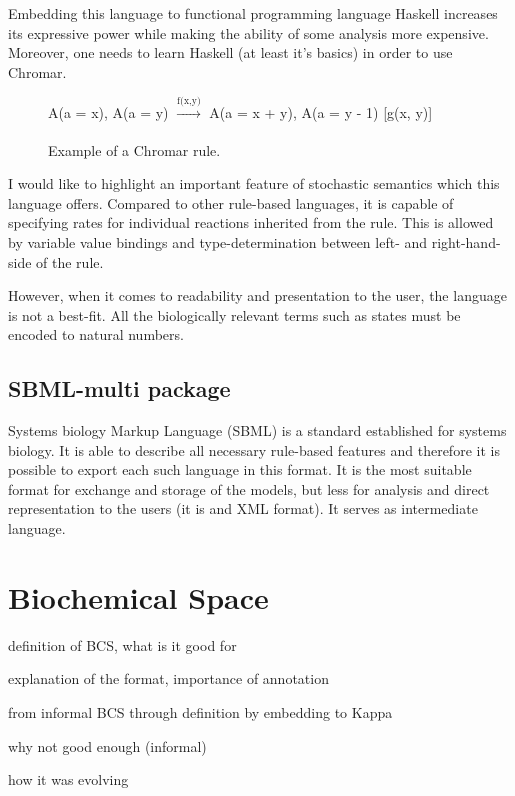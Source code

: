 \documentclass[12pt]{fithesis2}
\begin{document}
Embedding this language to functional programming language Haskell increases its expressive power while making the ability of some analysis more expensive. Moreover, one needs to learn Haskell (at least it's basics) in order to use Chromar.

\begin{figure}
\begin{center}
A(a = x), A(a = y) $\xrightarrow[]{\text{f(x,y)}}$ A(a = x + y), A(a = y - 1) [g(x, y)]
\end{center}
\caption{Example of a Chromar rule.}\label{chromar-rule}
\end{figure}

I would like to highlight an important feature of stochastic semantics which this language offers. Compared to other rule-based languages, it is capable of specifying rates for individual reactions inherited from the rule. This is allowed by variable value bindings and type-determination between left- and right-hand-side of the rule.

However, when it comes to readability and presentation to the user, the language is not a best-fit. All the biologically relevant terms such as states must be encoded to natural numbers.

\subsection{SBML-multi package}

Systems biology Markup Language (SBML) is a standard established for systems biology. It is able to describe all necessary rule-based features and therefore it is possible to export each such language in this format. It is the most suitable format for exchange and storage of the models, but less for analysis and direct representation to the users (it is and XML format). It serves as intermediate language. 

\section{Biochemical Space}

definition of BCS, what is it good for

explanation of the format, importance of annotation

from informal BCS through definition by embedding to Kappa

why not good enough (informal)

how it was evolving
\end{document}
